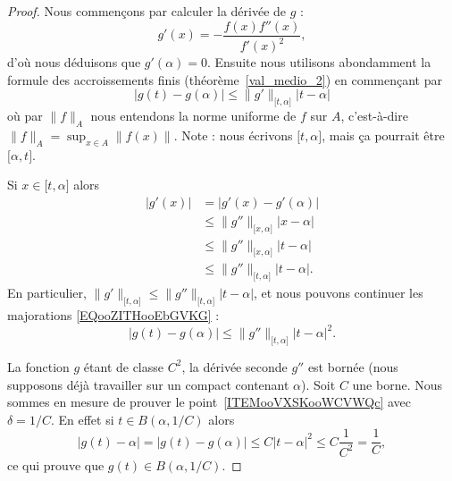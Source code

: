 \begin{proof}
	Nous commençons par calculer la dérivée de \( g\) :
	\begin{equation}
		g'(x)=-\frac{ f(x)f''(x) }{ f'(x)^2 },
	\end{equation}
	d'où nous déduisons que \( g'(\alpha)=0\). Ensuite nous utilisons abondamment la formule des accroissements finis (théorème~\ref{val_medio_2}) en commençant par
	\begin{equation}        \label{EQooZITHooEbGVKG}
		| g(t)-g(\alpha) |\leq \| g' \|_{\mathopen[ t , \alpha \mathclose]}| t-\alpha |
	\end{equation}
	où par \( \| f \|_A\) nous entendons la norme uniforme de \( f\) sur \( A\), c'est-à-dire \( \| f \|_A=\sup_{x\in A}\| f(x) \|\). Note : nous écrivons \( \mathopen[ t , \alpha \mathclose]\), mais ça pourrait être \( \mathopen[ \alpha , t \mathclose]\).

	Si \( x\in\mathopen[ t , \alpha \mathclose]\) alors
	\begin{subequations}
		\begin{align}
			| g'(x) | & =| g'(x)-g'(\alpha) |                                           \\
			          & \leq \| g'' \|_{\mathopen[ x , \alpha \mathclose]}| x-\alpha |  \\
			          & \leq \| g'' \|_{\mathopen[ x , \alpha \mathclose]}| t-\alpha |  \\
			          & \leq \| g'' \|_{\mathopen[ t , \alpha \mathclose]}| t-\alpha |.
		\end{align}
	\end{subequations}
	En particulier, \( \| g' \|_{\mathopen[ t , \alpha \mathclose]}\leq \| g'' \|_{\mathopen[ t , \alpha \mathclose]}| t-\alpha |\), et nous pouvons continuer les majorations \eqref{EQooZITHooEbGVKG} :
	\begin{equation}
		| g(t)-g(\alpha) |\leq \| g'' \|_{\mathopen[ t , \alpha \mathclose]}| t-\alpha |^2.
	\end{equation}

	La fonction \( g\) étant de classe \( C^2\), la dérivée seconde \( g''\) est bornée (nous supposons déjà travailler sur un compact contenant \( \alpha\)). Soit \( C\) une borne. Nous sommes en mesure de prouver le point~\ref{ITEMooVXSKooWCVWQc} avec \( \delta=1/C\). En effet si \( t\in B(\alpha,1/C)\) alors
	\begin{equation}
		| g(t)-\alpha |=| g(t)-g(\alpha) |\leq C| t-\alpha |^2\leq C\frac{1}{ C^2 }=\frac{1}{ C },
	\end{equation}
	ce qui prouve que \( g(t)\in B(\alpha,1/C)\).


\end{proof}
